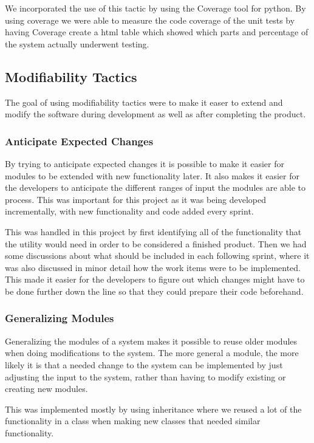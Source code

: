We incorporated the use of this tactic by using the Coverage tool for python. By using coverage we were able to measure the code coverage of the unit tests by having Coverage create a html table which showed which parts and percentage of the system actually underwent testing.

\subsection{Modifiability Tactics}
The goal of using modifiability tactics were to make it easer to extend and modify the software during development as well as after completing the product.

\subsubsection{Anticipate Expected Changes}
By trying to anticipate expected changes it is possible to make it easier for modules to be extended with new functionality later. It also makes it easier for the developers to anticipate the different ranges of input the modules are able to process. This was important for this project as it was being developed incrementally, with new functionality and code added every sprint.

This was handled in this project by first identifying all of the functionality that the utility would need in order to be considered a finished product. Then we had some discussions about what should be included in each following sprint, where it was also discussed in minor detail how the work items were to be implemented. This made it easier for the developers to figure out which changes might have to be done further down the line so that they could prepare their code beforehand.

\subsubsection{Generalizing Modules}
Generalizing the modules of a system makes it possible to reuse older modules when doing modifications to the system. The more general a module, the more likely it is that a needed change to the system can be implemented by just adjusting the input to the system, rather than having to modify existing or creating new modules.

This was implemented mostly by using inheritance where we reused a lot of the functionality in a class when making new classes that needed similar functionality.

